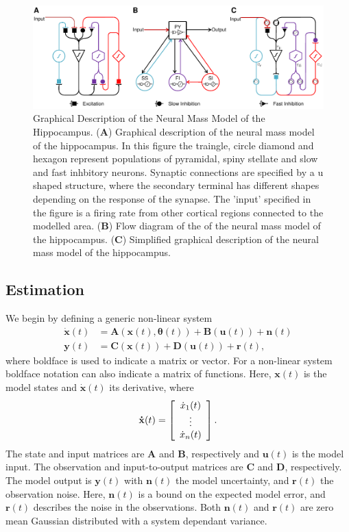  \begin{figure}
 	\centering
 		\includegraphics{fig/Biological_Model.pdf}
 	\caption{Graphical Description of the Neural Mass Model of the Hippocampus. (\textbf{A}) Graphical description of the neural mass model of the hippocampus. In this figure the traingle, circle diamond and hexagon represent populations of pyramidal, spiny stellate and slow and fast inhbitory neurons. Synaptic connections are specified by a u shaped structure, where the secondary terminal has different shapes depending on the response of the synapse. The 'input' specified in the figure is a firing rate from other cortical regions connected to the modelled area. (\textbf{B}) Flow diagram of the of the neural mass model of the hippocampus. (\textbf{C}) Simplified graphical description of the neural mass model of the hippocampus.}
 	\label{fig: Biological}
 \end{figure}


\subsection{Estimation}


We begin by defining a generic non-linear system\begin{align}
\label{eqn: NonlinEstS}
\mathbf{\dot{x}}(t) &= \mathbf{A}(\mathbf{x}(t),\mathbf{\theta}(t)) + \mathbf{B}(\mathbf{u}(t)) + \mathbf{n}(t)\\
\label{eqn: NonlinEstO}
\mathbf{y}(t)  &= \mathbf{C}(\mathbf{x}(t)) +\mathbf{D}(\mathbf{u}(t))+\mathbf{r}(t),
\end{align} where boldface is used to indicate a matrix or vector. For a non-linear system boldface notation can also indicate a matrix of functions. Here, $\mathbf{x}(t)$ is the model states and $\dot{\mathbf{x}}(t)$ its derivative, where
\[ \mathbf{\dot{x}}(t) = \left[ \begin{array}[pos]{c}
\dot{x}_{1}(t)\\
\vdots \\
\dot{x}_{n}(t) \end{array} \right] .\] The state and input matrices are $\mathbf{A}$ and $\mathbf{B}$, respectively and $\mathbf{u}(t)$ is the model input. The observation and input-to-output matrices are $\mathbf{C}$ and $\mathbf{D}$, respectively. The model output is $\mathbf{y}(t)$ with $\mathbf{n}(t)$ the model uncertainty, and $\mathbf{r}(t)$ the observation noise. Here, $\mathbf{n}(t)$ is a bound on the expected model error, and $\mathbf{r}(t)$ describes the noise in the observations. Both $\mathbf{n}(t)$ and $\mathbf{r}(t)$ are zero mean Gaussian distributed with a system dependant variance. 


